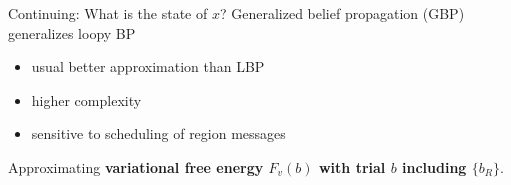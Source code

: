 \begin{frame}{Continuing: What is the state of $x$?}
  Generalized belief propagation (GBP) generalizes loopy BP
  \begin{itemize}[label={$\bullet$}]
  \item usual better approximation than LBP
  \item higher complexity
  \item sensitive to scheduling of region messages
  \end{itemize}
  Approximating \textbf{variational free energy $F_v(b)$  with trial $b$ including $\{b_R\}$}.
  \let\thefootnote\relax{}
\end{frame}

